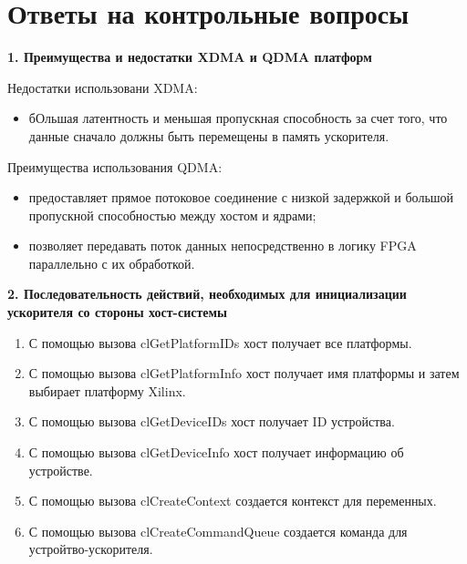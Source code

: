 \newpage

\section{Ответы на контрольные вопросы}

\textbf{1. Преимущества и недостатки XDMA и QDMA платформ}


Недостатки использовани XDMA:
\begin{itemize}
	\item бОльшая латентность и меньшая пропускная способность за счет того, что данные сначало должны быть перемещены в память ускорителя.
\end{itemize}

Преимущества использования QDMA:
\begin{itemize}
	\item предоставляет прямое потоковое соединение с низкой задержкой и большой пропускной способностью между хостом и ядрами;
	\item позволяет передавать поток данных непосредственно в логику FPGA параллельно с их обработкой.
\end{itemize}


\textbf{2. Последовательность действий, необходимых для инициализации ускорителя со стороны хост-системы}

\begin{enumerate}
	\item С помощью вызова clGetPlatformIDs хост получает все платформы.
	\item С помощью вызова clGetPlatformInfo хост получает имя платформы и затем выбирает  платформу Xilinx.
	\item С помощью вызова clGetDeviceIDs хост получает ID устройства.
	\item С помощью вызова clGetDeviceInfo хост получает информацию об устройстве.
	\item С помощью вызова clCreateContext создается контекст для переменных.
	\item С помощью вызова clCreateCommandQueue создается команда для устройтво-ускорителя.
\end{enumerate}

